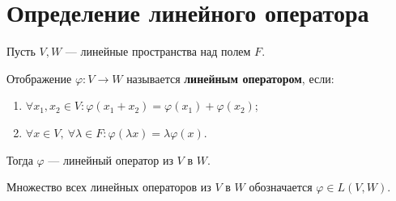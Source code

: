 \section{Определение линейного оператора}

\begin{definition}
Пусть $V, W$ --- линейные пространства над полем $F$.

Отображение $\varphi: V \to W$ называется \textbf{линейным оператором}, если:
\begin{enumerate}
    \item $\forall x_1, x_2 \in V: \varphi(x_1 + x_2) = \varphi(x_1) + \varphi(x_2)$;
    \item $\forall x \in V,\ \forall \lambda \in F: \varphi(\lambda x) = \lambda \varphi(x)$.
\end{enumerate}

Тогда $\varphi$ --- линейный оператор из $V$ в $W$.

Множество всех линейных операторов из $V$ в $W$ обозначается $\varphi \in L(V, W)$.
\end{definition}
